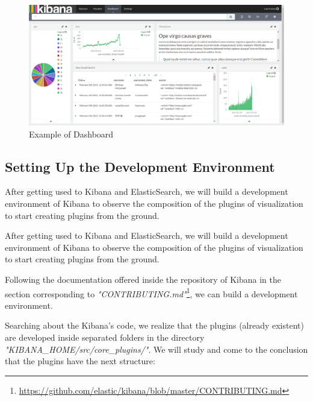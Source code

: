 \documentclass[a4paper, 12pt]{book}
\begin{document}
\begin{figure}[H]
  \centering
  \includegraphics[width=16cm, keepaspectratio]{img/development/twitterdashboard}
  \caption{Example of Dashboard}
  \label{fig:twitterdashboard}
\end{figure}


\subsection{Setting Up the Development Environment}

After getting used to Kibana and ElasticSearch, we will build a development environment of Kibana to observe the composition of the plugins of visualization to start creating plugins from the ground.

After getting used to Kibana and ElasticSearch, we will build a development environment of Kibana to observe the composition of the plugins of visualization to start creating plugins from the ground.

Following the documentation offered inside the repository of Kibana in the section corresponding to \textit{"CONTRIBUTING.md"}\footnote{\url{https://github.com/elastic/kibana/blob/master/CONTRIBUTING.md}}, we can build a development environment.

Searching about the Kibana’s code, we realize that the plugins (already existent) are developed inside separated folders in the directory \textit{"KIBANA\_HOME/src/core\_plugins/"}. We will study and come to the conclusion that the plugins have the next structure:
\end{document}
